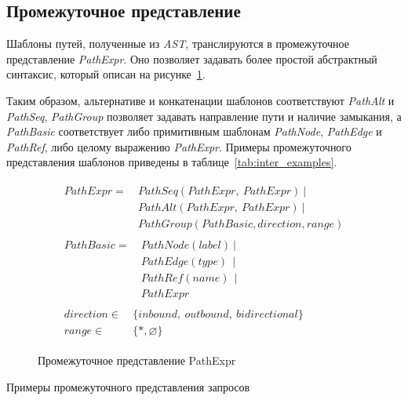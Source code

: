 \documentclass[14pt]{matmex-diploma-custom}
\begin{document}
\subsection{Промежуточное представление}\label{matrix-translation}
Шаблоны путей, полученные из \textit{AST}, транслируются в промежуточное представление \textit{PathExpr}. Оно позволяет задавать более простой абстрактный синтаксис, который описан на рисунке~\ref{fig:intermidiate_repr}. 

Таким образом, альтернативе и конкатенации шаблонов соответствуют \textit{PathAlt} и \textit{PathSeq}, \textit{PathGroup} позволяет задавать направление пути и наличие замыкания, а \textit{PathBasic} соответствует либо примитивным шаблонам \textit{PathNode}, \textit{PathEdge} и \textit{PathRef}, либо целому выражению \textit{PathExpr}. Примеры промежуточного представления шаблонов приведены в таблице~\ref{tab:inter_examples}.
\begin{figure}[h!]
\begin{align*}
\begin{split}
PathExpr=~ &PathSeq(PathExpr,~PathExpr)~|\\
           &PathAlt(PathExpr,~PathExpr)~|\\
           &PathGroup(PathBasic, direction, range)
\end{split}\\
\begin{split}
PathBasic=~ &PathNode(label)~|\\
            &PathEdge(type)~~|\\
            &PathRef(name) ~~|\\
            &PathExpr
\end{split}\\
\begin{split}
direction \in ~&\{inbound,~outbound,~bidirectional\}\\
range \in     ~&\{*, \varnothing\}
\end{split}
\end{align*}
\caption{Промежуточное представление PathExpr}
\label{fig:intermidiate_repr}
\end{figure}

\begin{table}[h]
\centering
\begin{adjustbox}{max width=\textwidth}

\end{adjustbox}
\caption{Примеры промежуточного представления запросов}
\label{tab:inter_examples}
\end{table}
\end{document}
